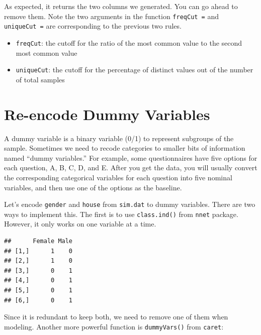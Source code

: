 \documentclass[12pt,]{krantz}
\newenvironment{Shaded}{\begin{snugshade}}{\end{snugshade}}
\newcommand{\KeywordTok}[1]{\textcolor[rgb]{0.13,0.29,0.53}{\textbf{{#1}}}}
\newcommand{\NormalTok}[1]{{#1}}
\providecommand{\tightlist}{%
  \setlength{\itemsep}{0pt}\setlength{\parskip}{0pt}}
\theoremstyle{definition}
\theoremstyle{definition}
\theoremstyle{remark}
\begin{document}
As expected, it returns the two columns we generated. You can go ahead
to remove them. Note the two arguments in the function
\texttt{freqCut\ =} and \texttt{uniqueCut\ =} are corresponding to the
previous two rules.

\begin{itemize}
\tightlist
\item
  \texttt{freqCut}: the cutoff for the ratio of the most common value to
  the second most common value
\item
  \texttt{uniqueCut}: the cutoff for the percentage of distinct values
  out of the number of total samples
\end{itemize}

\section{Re-encode Dummy Variables}\label{re-encode-dummy-variables}

A dummy variable is a binary variable (0/1) to represent subgroups of
the sample. Sometimes we need to recode categories to smaller bits of
information named ``dummy variables.'' For example, some questionnaires
have five options for each question, A, B, C, D, and E. After you get
the data, you will usually convert the corresponding categorical
variables for each question into five nominal variables, and then use
one of the options as the baseline.

Let's encode \texttt{gender} and \texttt{house} from \texttt{sim.dat} to
dummy variables. There are two ways to implement this. The first is to
use \texttt{class.ind()} from \texttt{nnet} package. However, it only
works on one variable at a time.

\begin{Shaded}
\end{Shaded}

\begin{verbatim}
##      Female Male
## [1,]      1    0
## [2,]      1    0
## [3,]      0    1
## [4,]      0    1
## [5,]      0    1
## [6,]      0    1
\end{verbatim}

Since it is redundant to keep both, we need to remove one of them when
modeling. Another more powerful function is \texttt{dummyVars()} from
\texttt{caret}:
\end{document}
